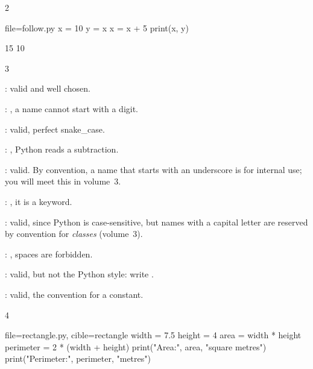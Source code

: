 \begin{corrige}{2}
\begin{code}{file=follow.py}
x = 10
y = x
x = x + 5
print(x, y)
\end{code}
\begin{sortie}
15 10
\end{sortie}
\end{corrige}

\begin{corrige}{3}
\begin{reponses}
\item {}: valid and well chosen.
\item {}: , a name cannot start with a digit.
\item {}: valid, perfect snake\_case.
\item {}: , Python reads a subtraction.
\item {}: valid. By convention, a name that starts with an underscore is for internal use;
  you will meet this in volume~3.
\item {}: , it is a keyword.
\item {}: valid, since Python is case-sensitive, but names with a capital letter are reserved
  by convention for \emph{classes} (volume~3).
\item {}: , spaces are forbidden.
\item {}: valid, but not the Python style: write .
\item {}: valid, the convention for a constant.
\end{reponses}
\end{corrige}

\begin{corrige}{4}
\begin{code}{file=rectangle.py, cible=rectangle}
width = 7.5
height = 4
area = width * height
perimeter = 2 * (width + height)
print("Area:", area, "square metres")
print("Perimeter:", perimeter, "metres")
\end{code}
\end{corrige}

